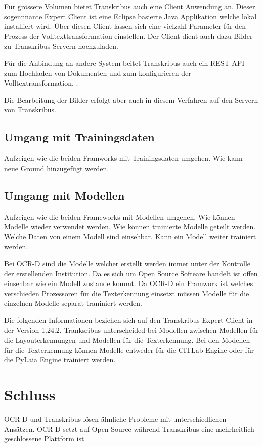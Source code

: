 \documentclass[a4paper,oneside, 12pt]{report}
\begin{document}
Für grössere Volumen bietet Transkribus auch eine Client Anwendung an. Dieser sogennnante Expert Client ist eine Eclipse basierte Java Applikation welche lokal installiert wird. Über diesen Client lassen sich eine vielzahl Parameter für den Prozess der Volltexttransformation einstellen. Der Client dient auch dazu Bilder zu Transkribus Servern hochzuladen. \cite{transkribusclient}

Für die Anbindung an andere System beitet Transkribus auch ein REST API zum Hochladen von Dokumenten und zum konfigurieren der Volltextransformation. \cite{transkribusapi}. 

Die Bearbeitung der Bilder erfolgt aber auch in diesem Verfahren auf den Servern von Transkribus.

\section{Umgang mit Trainingsdaten}
Aufzeigen wie die beiden Framworks mit Trainingsdaten umgehen. Wie kann neue Ground hinzugefügt werden.

\section{Umgang mit Modellen}
Aufzeigen wie die beiden Frameworks mit Modellen umgehen. Wie können Modelle wieder verwendet werden. Wie können trainierte Modelle geteilt werden. Welche Daten von einem Modell sind einsehbar. Kann ein Modell weiter trainiert werden.

Bei OCR-D sind die Modelle welcher erstellt werden immer unter der Kontrolle der erstellenden Institution. Da es sich um Open Source Softeare handelt ist offen einsehbar wie ein Modell zustande kommt. Da OCR-D ein Framwork ist welches verschieden Prozessoren für die Texterkennung einsetzt müssen Modelle für die einzelnen Modelle separat traniniert werden. 

Die folgenden Informationen beziehen sich auf den Transkribus Expert Client in der Version 1.24.2. Tranksribus unterscheided bei Modellen zwischen Modellen für die Layouterkennungen und Modellen für die Texterkennung. Bei den Modellen für die Texterkennung können Modelle entweder für die CITLab Engine oder für die PyLaia Engine trainiert werden.

\chapter{Schluss}\label{sec:schluss}
OCR-D und Transkribus lösen ähnliche Probleme mit unterschiedlichen Ansätzen. OCR-D setzt auf Open Source während Transkribus eine mehrheitlich geschlossene Plattform ist.
\end{document}
